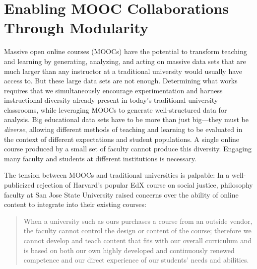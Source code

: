 

\def\thetitle{Enabling MOOC Collaborations Through Modularity}
\def\shorttitle{Modular MOOCs}
\def\theauthors{Geoffrey Challen}
\def\shortauthors{Challen}
\def\submissiondate{\today}
\def\whitepapername{Learning with MOOCs}


\pagestyle{whitepaper}
\thispagestyle{emptywhitepaper}

\chapter{\thetitle}

Massive open online courses (MOOCs) have the potential to transform teaching
and learning by generating, analyzing, and acting on massive data sets that
are much larger than any instructor at a traditional university would usually
have access to. But these large data sets are not enough. Determining what
works requires that we simultaneously encourage experimentation and harness
instructional diversity already present in today's traditional university
classrooms, while leveraging MOOCs to generate well-structured data for
analysis. Big educational data sets have to be more than just big---they must
be \textit{diverse}, allowing different methods of teaching and learning to
be evaluated in the context of different expectations and student
populations. A single online course produced by a small set of faculty cannot
produce this diversity. Engaging many faculty and students at different
institutions is necessary.

The tension between MOOCs and traditional universities is palpable: In a
well-publicized rejection of Harvard's popular EdX course on social justice,
philosophy faculty at San Jose State University raised concerns over the
ability of online content to integrate into their existing courses:

\begin{quote}

When a university such as ours purchases a course from an outside vendor, the
faculty cannot control the design or content of the course; therefore we
cannot develop and teach content that fits with our overall curriculum and is
based on both our own highly developed and continuously renewed competence
and our direct experience of our students' needs and abilities.

\end{quote}


